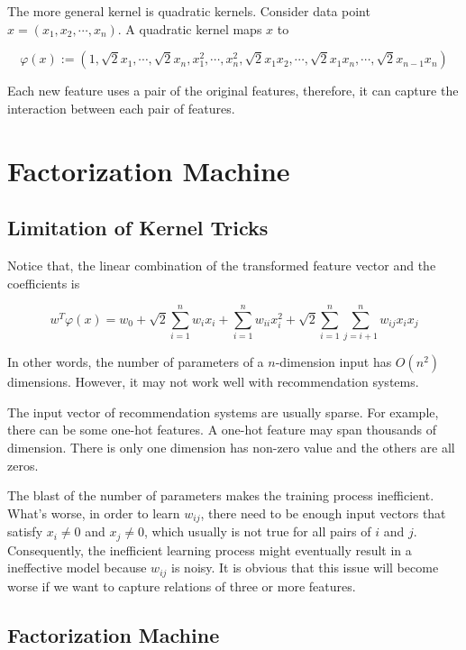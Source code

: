         The more general kernel is quadratic kernels.
        Consider data point $x = (x_1, x_2, \cdots, x_n)$.
        A quadratic kernel maps $x$ to 

        \[
        \varphi(x) := (1, \sqrt{2}x_1, \cdots, \sqrt{2}x_n, x_1^2, \cdots, x_n^2,
          \sqrt{2}x_1x_2, \cdots, \sqrt{2}x_1x_n, \cdots, \sqrt{2}x_{n-1}x_n)
        \]

        Each new feature uses a pair of the original features,
        therefore, it can capture the interaction between each pair of features.

\section{Factorization Machine}

    \subsection{Limitation of Kernel Tricks}

        Notice that, the linear combination of the transformed feature vector and the coefficients is

        \[
        w^T\varphi(x) = w_0 + \sqrt{2}\sum_{i=1}^n w_ix_i
        + \sum_{i=1}^n w_{ii}x_i^2 + \sqrt{2}\sum_{i=1}^n\sum_{j=i+1}^n w_{ij}x_ix_j
        \]

        In other words, the number of parameters of a $n$-dimension input has $O(n^2)$ dimensions.
        However, it may not work well with recommendation systems.

        The input vector of recommendation systems are usually sparse.
        For example, there can be some one-hot features.
        A one-hot feature may span thousands of dimension.
        There is only one dimension has non-zero value and the others are all zeros.

        The blast of the number of parameters makes the training process inefficient.
        What's worse, in order to learn $w_{ij}$,
        there need to be enough input vectors that satisfy $x_i \neq 0$ and $x_j \neq 0$,
        which usually is not true for all pairs of $i$ and $j$.
        Consequently, the inefficient learning process might eventually result in a ineffective model
        because $w_{ij}$ is noisy.
        It is obvious that this issue will become worse if we want to capture relations of three or more features.

    \subsection{Factorization Machine}

